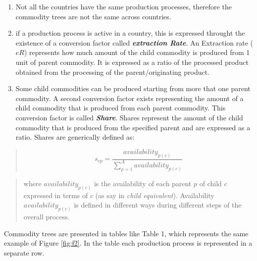 \documentclass[]{article}
\begin{document}
\begin{enumerate}
\def\labelenumi{\arabic{enumi}.}
\setcounter{enumi}{1}
\item
  Not all the countries have the same production processes, therefore
  the commodity trees are not the same across countries.
\item
  if a production process is active in a country, this is expressed
  throught the existence of a conversion factor called
  \textbf{\emph{extraction Rate}}. An Extraction rate (\(eR\))
  represents how much amount of the child commodity is produced from 1
  unit of parent commodity. It is expressed as a ratio of the processed
  product obtained from the processing of the parent/originating
  product.
\item
  Some child commodities can be produced starting from more that one
  parent commodity. A second conversion factor exists representing the
  amount of a child commodity that is produced from each parent
  commodity. This conversion factor is called \textbf{\emph{Share}}.
  Shares represent the amount of the child commodity that is produced
  from the specified parent and are expressed as a ratio. Shares are
  generically defined as:
\end{enumerate}

\begin{quote}
\begin{equation}
\label{eq:sharesGen}
s_{cp} = \frac{availability_{p(c)}}{\sum \limits_{p=1}^A{availability_{p(c)}}}
\end{equation}
\end{quote}

\begin{quote}
where \(availability_{p(c)}\) is the availability of each parent \(p\)
of child \(c\) expressed in terms of \(c\) (as say in \emph{child
equivalent}). Availability \(availability_{p(c)}\) is defined in
different ways during different steps of the overall process.
\end{quote}

Commodity trees are presented in tables like Table 1, which represents
the same example of Figure \ref{fig:f2}. In the table each production
process is represented in a separate row.
\end{document}
